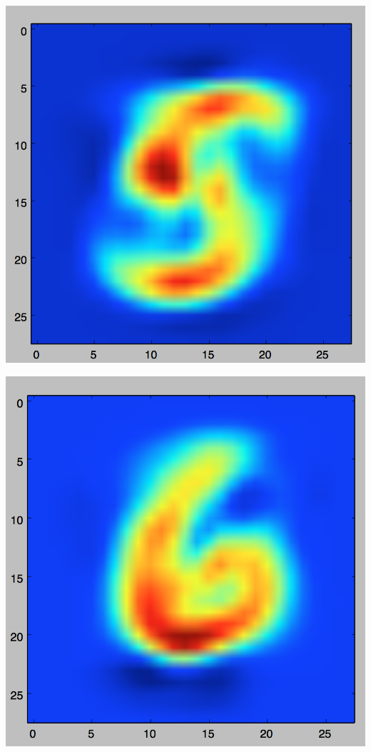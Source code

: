 \documentclass[11pt]{article}
\begin{document}
\includegraphics[scale=.3]{images/bayes5.png}

\includegraphics[scale=.3]{images/bayes6.png}
\end{document}
